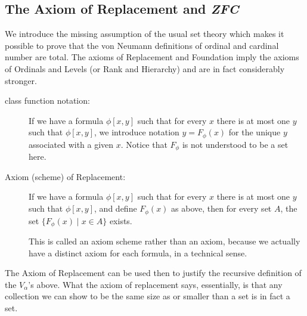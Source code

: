 \documentclass[12pt]{book}
\begin{document}
\newpage

\subsection{The Axiom of Replacement and {\em ZFC\/}}

We introduce the missing assumption of the usual set theory which
makes it possible to prove that the von Neumann definitions of ordinal
and cardinal number are total.  The axioms of Replacement and Foundation imply
the axioms of Ordinals and Levels (or Rank and Hierarchy) and are in fact considerably stronger.

\begin{description}

\item[class function notation:] If we have a formula $\phi[x,y]$ such
that for every $x$ there is at most one $y$ such that $\phi[x,y]$, we
introduce notation $y = F_{\phi}(x)$ for the unique $y$ associated
with a given $x$.  Notice that $F_{\phi}$ is not understood to be a
set here.

\item[Axiom (scheme) of Replacement:] If we have a formula $\phi[x,y]$ such
that for every $x$ there is at most one $y$ such that $\phi[x,y]$, and
define $F_{\phi}(x)$ as above, then for every set $A$, the set
$\{F_{\phi}(x) \mid x \in A\}$ exists.

This is called an axiom scheme rather than an axiom, because we actually have a distinct axiom for each formula, in a technical sense.

\end{description}

The Axiom of Replacement can be used then to justify the recursive
definition of the $V_{\alpha}$'s above.  What the axiom of replacement
says, essentially, is that any collection we can show to be the same
size as or smaller than a set is in fact a set.
\end{document}
